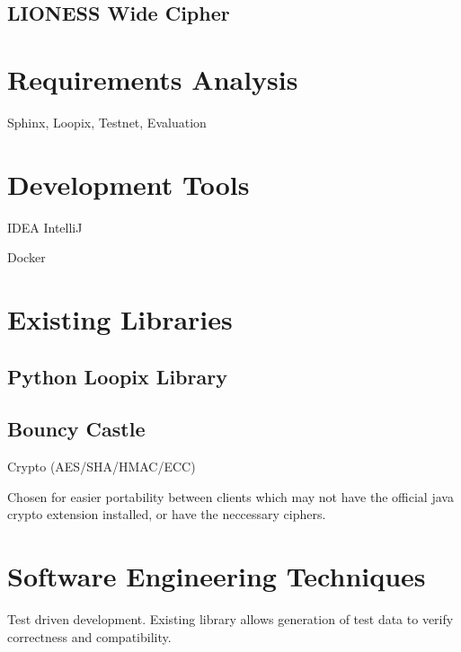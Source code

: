 \documentclass[final,dissertation.tex]{subfiles}
\begin{document}
\subsection{LIONESS Wide Cipher}

\section{Requirements Analysis}

Sphinx, Loopix, Testnet, Evaluation

\section{Development Tools}

IDEA IntelliJ

Docker

\section{Existing Libraries}

\subsection{Python Loopix Library}

\subsection{Bouncy Castle}
\label{sec:bouncy}

Crypto (AES/SHA/HMAC/ECC)

Chosen for easier portability between clients which may not have the official java crypto extension installed, or have the neccessary ciphers.

\section{Software Engineering Techniques}

Test driven development. Existing library allows generation of test data to verify correctness and compatibility.
\end{document}
